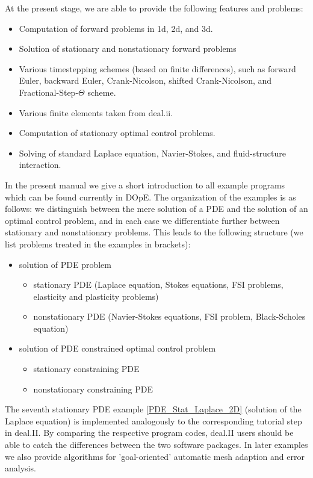 \documentclass[a4paper,cleardoubleempty]{scrreprt}
\begin{document}
At the present stage, we are able to provide the following features and 
problems:
\begin{itemize}
\item Computation of forward problems in 1d, 2d, and 3d.
\item Solution of stationary and nonstationary forward problems
\item Various timestepping schemes (based on finite differences), 
  such as forward Euler, backward Euler,
  Crank-Nicolson, shifted Crank-Nicolson, and Fractional-Step-$\Theta$ scheme.
\item Various finite elements taken from deal.ii.
\item Computation of stationary optimal control problems.
\item Solving of standard Laplace equation, Navier-Stokes, and 
fluid-structure interaction. 
\end{itemize}
 
In the present manual we give a short introduction to all example programs
which can be found currently in DOpE. The organization of the examples is
as follows: we distinguish between the mere solution of a PDE and the
solution of an optimal control problem, and in each case we differentiate
further between stationary and nonstationary problems. This leads to the
following structure (we list problems treated in the examples in
brackets):
\begin{itemize}
\item
solution of PDE problem
 \begin{itemize}
   \item
     stationary PDE (Laplace equation, Stokes equations, FSI problems,
elasticity and plasticity problems)
   \item
     nonstationary PDE (Navier-Stokes equations, FSI problem, Black-Scholes
equation)
 \end{itemize}
\item
solution of PDE constrained optimal control problem
 \begin{itemize}
   \item
     stationary constraining PDE
   \item
     nonstationary constraining PDE
 \end{itemize}
\end{itemize}
The seventh stationary PDE example \ref{PDE_Stat_Laplace_2D} 
(solution of the Laplace equation) is
implemented analogously to the corresponding tutorial step in deal.II. By
comparing the respective program codes, deal.II users should be able to
catch the differences between the two software packages.
In later examples we also provide algorithms for 'goal-oriented' automatic
mesh adaption and error analysis.
\end{document}
